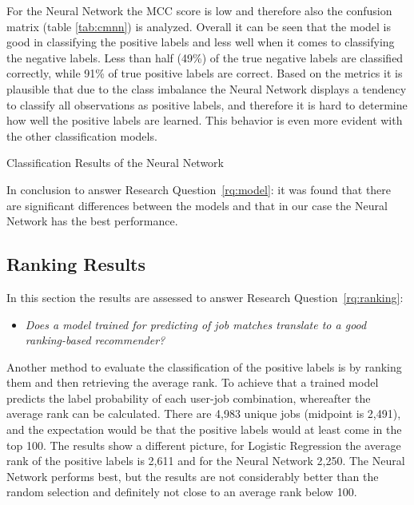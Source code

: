 For the Neural Network the MCC score is low and therefore also the confusion matrix (table \ref{tab:cmnn}) is analyzed.
Overall it can be seen that the model is good in classifying the positive labels and less well when it comes to classifying the negative labels.
Less than half (49\%) of the true negative labels are classified correctly, while 91\% of true positive labels are correct.
Based on the metrics it is plausible that due to the class imbalance the Neural Network displays a tendency to classify all observations as positive labels, and therefore it is hard to determine how well the positive labels are learned.
This behavior is even more evident with the other classification models.

\begin{table}[h]
\begin{footnotesize}

\end{footnotesize}
\caption{\label{tab:cmnn} \footnotesize{Classification Results of the Neural Network}}
\end{table}

In conclusion to answer Research Question~\ref{rq:model}: it was found that there are significant differences between the models and that in our case the Neural Network has the best performance.

\subsection{Ranking Results}
\label{ssec:rr}

In this section the results are assessed to answer Research Question~\ref{rq:ranking}:
\begin{itemize}
	\item[] \em Does a model trained for predicting of job matches translate to a good ranking-based recommender?
\end{itemize}

\noindent Another method to evaluate the classification of the positive labels is by ranking them and then retrieving the average rank.
To achieve that a trained model predicts the label probability of each user-job combination, whereafter the average rank can be calculated.
There are 4,983 unique jobs (midpoint is 2,491), and the expectation would be that the positive labels would at least come in the top 100. 
The results show a different picture, for Logistic Regression the average rank of the positive labels is 2,611 and for the Neural Network 2,250.
The Neural Network performs best, but the results are not considerably better than the random selection and definitely not close to an average rank below 100.

